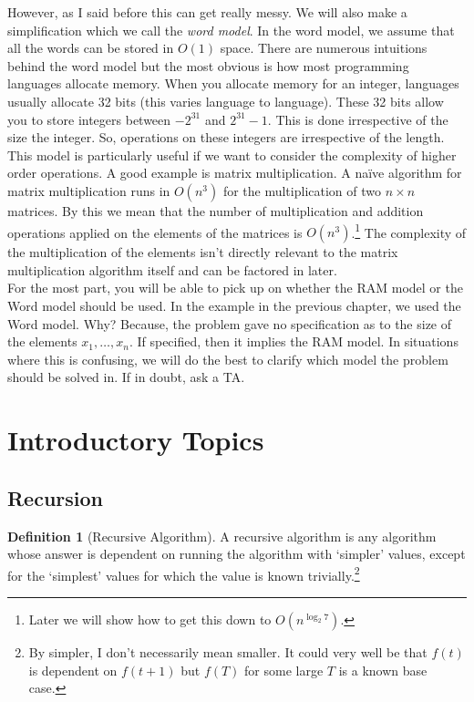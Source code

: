 \documentclass[10pt]{article}
\theoremstyle{plain}
\theoremstyle{definition}
\newtheorem{defn}[thm]{Definition} %
\numberwithin{equation}{section}
\numberwithin{figure}{section}
\begin{document}
\noindent However, as I said before this can get really messy. We will also make a simplification which we call the \emph{word model}. In the word model, we assume that all the words can be stored in $O(1)$ space. There are numerous intuitions behind the word model but the most obvious is how most programming languages allocate memory. When you allocate memory for an integer, languages usually allocate 32 bits (this varies language to language). These 32 bits allow you to store integers between $-2^{31}$ and $2^{31} - 1$. This is done irrespective of the size the integer. So, operations on these integers are irrespective of the length. \\

\noindent This model is particularly useful if we want to consider the complexity of higher order operations. A good example is matrix multiplication. A na\"ive algorithm for matrix multiplication runs in $O(n^3)$ for the multiplication of two $n \times n$ matrices. By this we mean that the number of multiplication and addition operations applied on the elements of the matrices is $O(n^3)$.\footnote{Later we will show how to get this down to $O(n^{\log_2 7})$.} The complexity of the multiplication of the elements isn't directly relevant to the matrix multiplication algorithm itself and can be factored in later. \\

\noindent For the most part, you will be able to pick up on whether the RAM model or the Word model should be used. In the example in the previous chapter, we used the Word model. Why? Because, the problem gave no specification as to the size of the elements $x_1, \ldots, x_n$. If specified, then it implies the RAM model. In situations where this is confusing, we will do the best to clarify which model the problem should be solved in. If in doubt, ask a TA.







\newpage
\section{Introductory Topics}

\subsection{Recursion}

\begin{defn}[Recursive Algorithm]
A recursive algorithm is any algorithm whose answer is dependent on running the algorithm with `simpler' values, except for the `simplest' values for which the value is known trivially.\footnote{By simpler, I don't necessarily mean smaller. It could very well be that $f(t)$ is dependent on $f(t + 1)$ but $f(T)$ for some large $T$ is a known base case.}
\end{defn}
\end{document}
